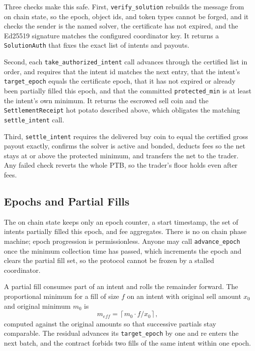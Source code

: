 \documentclass[10pt,sigconf,nonacm]{acmart}
\theoremstyle{reiythm}
\begin{document}
Three checks make this safe. First, \texttt{verify\_solution} rebuilds the message
from on chain state, so the epoch, object ids, and token types cannot be forged,
and it checks the sender is the named solver, the certificate has not expired, and
the Ed25519 signature matches the configured coordinator key. It returns a
\texttt{SolutionAuth} that fixes the exact list of intents and payouts.

Second, each \texttt{take\_authorized\_intent} call advances through the certified
list in order, and requires that the intent id matches the next entry, that the
intent's \texttt{target\_epoch} equals the certificate epoch, that it has not
expired or already been partially filled this epoch, and that the committed
\texttt{protected\_min} is at least the intent's own minimum. It returns the
escrowed sell coin and the \texttt{SettlementReceipt} hot potato described above,
which obligates the matching \texttt{settle\_intent} call.

Third, \texttt{settle\_intent} requires the delivered buy coin to equal the
certified gross payout exactly, confirms the solver is active and bonded, deducts
fees so the net stays at or above the protected minimum, and transfers the net to
the trader. Any failed check reverts the whole PTB, so the trader's floor holds
even after fees.

\subsection{Epochs and Partial Fills}

The on chain state keeps only an epoch counter, a start timestamp, the set of
intents partially filled this epoch, and fee aggregates. There is no on chain
phase machine; epoch progression is permissionless. Anyone may call
\texttt{advance\_epoch} once the minimum collection time has passed, which
increments the epoch and clears the partial fill set, so the protocol cannot be
frozen by a stalled coordinator.

A partial fill consumes part of an intent and rolls the remainder forward. The
proportional minimum for a fill of size $f$ on an intent with original sell amount
$x_0$ and original minimum $m_0$ is
\[
  m_{\mathit{eff}} = \left\lceil m_0 \cdot f / x_0 \right\rceil ,
\]
computed against the original amounts so that successive partials stay comparable.
The residual advances its \texttt{target\_epoch} by one and re enters the next
batch, and the contract forbids two fills of the same intent within one epoch.
\end{document}
